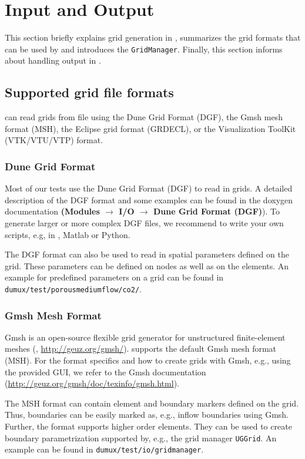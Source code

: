 \section{Input and Output}
\label{sec:inputandoutput}

This section briefly explains grid generation in \Dumux, summarizes
the grid formats that can be used by \Dumux and introduces the \Dumux \texttt{GridManager}.
Finally, this section informs about handling output in \Dumux.

\subsection{Supported grid file formats}
\label{sec:supportedGridFormats}
\Dumux can read grids from file using the Dune Grid Format (DGF), the Gmsh mesh format (MSH), the Eclipse grid format (GRDECL), or the Visualization ToolKit (VTK/VTU/VTP) format. 

\subsubsection{Dune Grid Format}
Most of our \Dumux tests use the Dune Grid Format (DGF) to read in grids. A detailed description
of the DGF format and some examples can be found in the \Dune doxygen documentation
\textbf{(Modules $\rightarrow$ I/O $\rightarrow$ Dune Grid Format (DGF)}). To generate larger or more
complex DGF files, we recommend to write your own scripts, e.g, in \Cplusplus, Matlab or Python.

The DGF format can also be used to read in spatial parameters defined on the grid. These parameters can
be defined on nodes as well as on the elements. An example for predefined parameters on a grid
can be found in \texttt{dumux/test/porousmediumflow/co2/}.

\subsubsection{Gmsh Mesh Format}
Gmsh is an open-source flexible grid generator for unstructured finite-element meshes (\cite{GEUZAINE2009}, \url{http://geuz.org/gmsh/}).
\Dumux supports the default Gmsh mesh format (MSH). For the format specifics and how to create grids with Gmsh, e.g., using
the provided GUI, we refer to the Gmsh documentation (\url{http://geuz.org/gmsh/doc/texinfo/gmsh.html}).

The MSH format can contain element and boundary markers defined on the grid. Thus, boundaries can be easily marked as, e.g., inflow boundaries
using Gmsh. Further, the format supports higher order elements. They can be used to create boundary parametrization supported by, e.g., the grid
manager \texttt{UGGrid}.
An example can be found in \texttt{dumux/test\allowbreak/io/gridmanager}.

